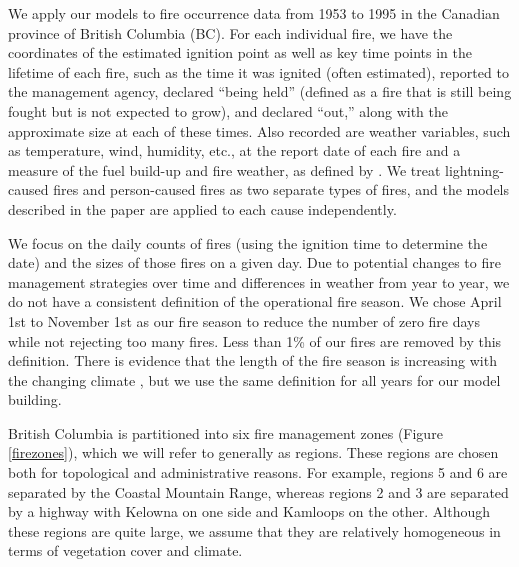 \documentclass[10pt,letterpaper]{article}
\begin{document}
We apply our models to fire occurrence data from 1953 to 1995 in the
Canadian province of British Columbia (BC). For each individual fire, we have the coordinates of the estimated ignition point as well as key time points in the lifetime of each fire, such as the time it was ignited (often estimated), reported to the management agency, declared
``being held'' (defined as a fire that is still being fought but is not
expected to grow), and declared ``out,'' along with the approximate size
at each of these times. Also recorded are weather variables, such as temperature,
wind, humidity, etc., at the report date of each fire and a measure of
the fuel build-up and fire weather, as defined by
\cite{vanwagnerDevelopmentStructureCanadian1987a,wottonInterpretingUsingOutputs2009}. We treat
lightning-caused fires and person-caused fires as two separate types of
fires, and the models described in the paper are applied to each
cause independently.

We focus on the daily counts of fires (using the ignition time to
determine the date) and the sizes of those fires on a given day. Due to
potential changes to fire management strategies over time and differences in weather from year to year,
we do not have a consistent definition of the operational fire season.
We chose April 1st to
November 1st as our fire season to reduce the number of zero fire days
while not rejecting too many fires. Less than 1\% of our fires are
removed by this definition. There is evidence that the length of the
fire season is increasing with the changing climate
\cite{albert-greenMethodologyInvestigatingTrends2013,hanesFireregimeChangesCanada2019},
but we use the same definition for all years for our model building.

British Columbia is partitioned into six fire management zones (Figure
\ref{firezones}), which we will refer to generally as regions. These
regions are chosen both for topological and administrative reasons. For
example, regions 5 and 6 are separated by the Coastal Mountain Range,
whereas regions 2 and 3 are separated by a highway with Kelowna on one
side and Kamloops on the other. Although these regions are quite large,
we assume that they are relatively homogeneous in terms of
vegetation cover and climate.
\end{document}
